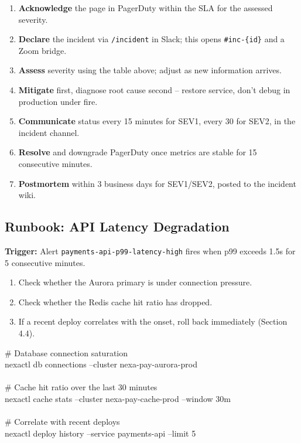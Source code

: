 \documentclass[11pt,a4paper,parskip=half]{scrartcl}
\begin{document}
\begin{enumerate}[leftmargin=*]
  \item \textbf{Acknowledge} the page in PagerDuty within the SLA for the assessed severity.
  \item \textbf{Declare} the incident via \texttt{/incident} in Slack; this opens \texttt{\#inc-\{id\}} and a Zoom bridge.
  \item \textbf{Assess} severity using the table above; adjust as new information arrives.
  \item \textbf{Mitigate} first, diagnose root cause second -- restore service, don't debug in production under fire.
  \item \textbf{Communicate} status every 15 minutes for SEV1, every 30 for SEV2, in the incident channel.
  \item \textbf{Resolve} and downgrade PagerDuty once metrics are stable for 15 consecutive minutes.
  \item \textbf{Postmortem} within 3 business days for SEV1/SEV2, posted to the incident wiki.
\end{enumerate}

\subsection{Runbook: API Latency Degradation}

\textbf{Trigger:} Alert \texttt{payments-api-p99-latency-high} fires when p99 exceeds 1.5s
for 5 consecutive minutes.

\begin{enumerate}[leftmargin=*]
  \item Check whether the Aurora primary is under connection pressure.
  \item Check whether the Redis cache hit ratio has dropped.
  \item If a recent deploy correlates with the onset, roll back immediately (Section 4.4).
\end{enumerate}

\begin{cmdbox}
\# Database connection saturation\\
nexactl db connections --cluster nexa-pay-aurora-prod\\
\\
\# Cache hit ratio over the last 30 minutes\\
nexactl cache stats --cluster nexa-pay-cache-prod --window 30m\\
\\
\# Correlate with recent deploys\\
nexactl deploy history --service payments-api --limit 5
\end{cmdbox}
\end{document}
